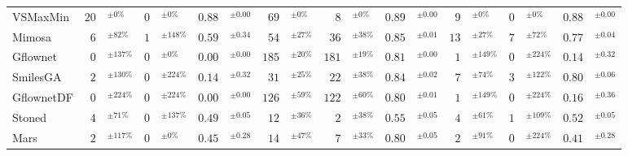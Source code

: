 \begin{tabular}{lr@{}lr@{}lr@{}lr@{}lr@{}lr@{}lr@{}lr@{}lr@{}l}
VSMaxMin & $20$& $^{\pm0\%}$ & $0$& $^{\pm0\%}$ & $0.88$& $^{\pm0.00}$ & $69$& $^{\pm0\%}$ & $8$& $^{\pm0\%}$ & $0.89$& $^{\pm0.00}$ & $9$& $^{\pm0\%}$ & $0$& $^{\pm0\%}$ & $0.88$& $^{\pm0.00}$ \\
Mimosa & $6$& $^{\pm82\%}$ & $1$& $^{\pm148\%}$ & $0.59$& $^{\pm0.34}$ & $54$& $^{\pm27\%}$ & $36$& $^{\pm38\%}$ & $0.85$& $^{\pm0.01}$ & $13$& $^{\pm27\%}$ & $7$& $^{\pm72\%}$ & $0.77$& $^{\pm0.04}$ \\
Gflownet & $0$& $^{\pm137\%}$ & $0$& $^{\pm0\%}$ & $0.00$& $^{\pm0.00}$ & $185$& $^{\pm20\%}$ & $181$& $^{\pm19\%}$ & $0.81$& $^{\pm0.00}$ & $1$& $^{\pm149\%}$ & $0$& $^{\pm224\%}$ & $0.14$& $^{\pm0.32}$ \\
SmilesGA & $2$& $^{\pm130\%}$ & $0$& $^{\pm224\%}$ & $0.14$& $^{\pm0.32}$ & $31$& $^{\pm25\%}$ & $22$& $^{\pm38\%}$ & $0.84$& $^{\pm0.02}$ & $7$& $^{\pm74\%}$ & $3$& $^{\pm122\%}$ & $0.80$& $^{\pm0.06}$ \\
GflownetDF & $0$& $^{\pm224\%}$ & $0$& $^{\pm224\%}$ & $0.00$& $^{\pm0.00}$ & $126$& $^{\pm59\%}$ & $122$& $^{\pm60\%}$ & $0.80$& $^{\pm0.01}$ & $1$& $^{\pm149\%}$ & $0$& $^{\pm224\%}$ & $0.16$& $^{\pm0.36}$ \\
Stoned & $4$& $^{\pm71\%}$ & $0$& $^{\pm137\%}$ & $0.49$& $^{\pm0.05}$ & $12$& $^{\pm36\%}$ & $2$& $^{\pm38\%}$ & $0.55$& $^{\pm0.05}$ & $4$& $^{\pm61\%}$ & $1$& $^{\pm109\%}$ & $0.52$& $^{\pm0.05}$ \\
Mars & $2$& $^{\pm117\%}$ & $0$& $^{\pm0\%}$ & $0.45$& $^{\pm0.28}$ & $14$& $^{\pm47\%}$ & $7$& $^{\pm33\%}$ & $0.80$& $^{\pm0.05}$ & $2$& $^{\pm91\%}$ & $0$& $^{\pm224\%}$ & $0.41$& $^{\pm0.28}$ \\
\bottomrule
\end{tabular}